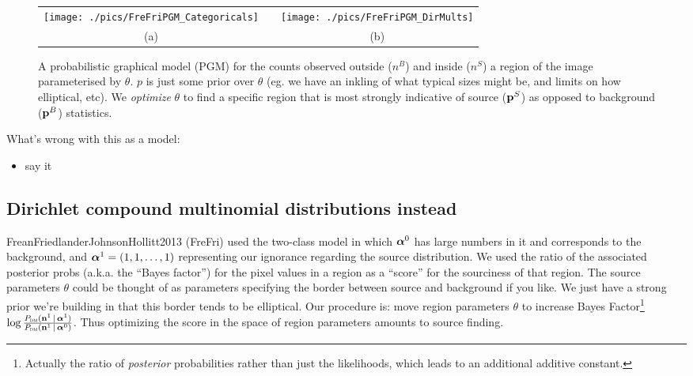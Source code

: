 \documentclass[12pt]{article}
\begin{document}
\begin{figure}
  \begin{tabular}[c]{ccc}
\texttt{[image: ./pics/FreFriPGM\_Categoricals]} & \hspace{2cm} &
\texttt{[image: ./pics/FreFriPGM\_DirMults]} \\
(a)& & (b)
  \end{tabular}
\caption{A probabilistic graphical model (PGM) for the counts observed
  outside ($n^B$) and inside ($n^S$) a region of the image
  parameterised by $\theta$. $p$ is just some prior over $\theta$
  (eg. we have an inkling of what typical sizes might be, and limits
  on how elliptical, etc).  We {\it optimize} $\theta$ to find a
  specific region that is most strongly indicative of source ($\mathbf{p}^S$)
  as opposed to background ($\mathbf{p}^B$) statistics.
  \label{fig:FreFriPGM_Categoricals} 
}
\end{figure}


{\sc What's wrong with this as a model:}
\begin{itemize}
\item say it
\end{itemize}


\subsection{Dirichlet compound multinomial distributions instead} 
FreanFriedlanderJohnsonHollitt2013 ({\sc FreFri}) used the two-class model in
which $\boldsymbol\alpha^0$ has large numbers in it and corresponds to the
background, and $\boldsymbol\alpha^1 = (1,1,\ldots,1)$ representing our
ignorance regarding the source distribution. We used the ratio of the
associated posterior probs (a.k.a. the ``Bayes factor'') for the pixel
values in a region as a ``score'' for the sourciness of that
region. The source parameters $\theta$ could be thought of as
parameters specifying the border between source and background if you
like. We just have a strong prior we're building in that this border
tends to be elliptical.  Our procedure is: move region parameters
$\theta$ to increase Bayes Factor\footnote{Actually the ratio of
  \emph{posterior} probabilities rather than just the likelihoods,
  which leads to an additional additive constant.} $\log
\frac{P_\text{\tiny\sc dm}(\mathbf{n}^1 \,|\, \boldsymbol\alpha^1)}{P_\text{\tiny\sc dm}(\mathbf{n}^1 \,|\,
  \boldsymbol\alpha^0)}$.  Thus optimizing the score in the space of region
parameters amounts to source finding.
\end{document}
